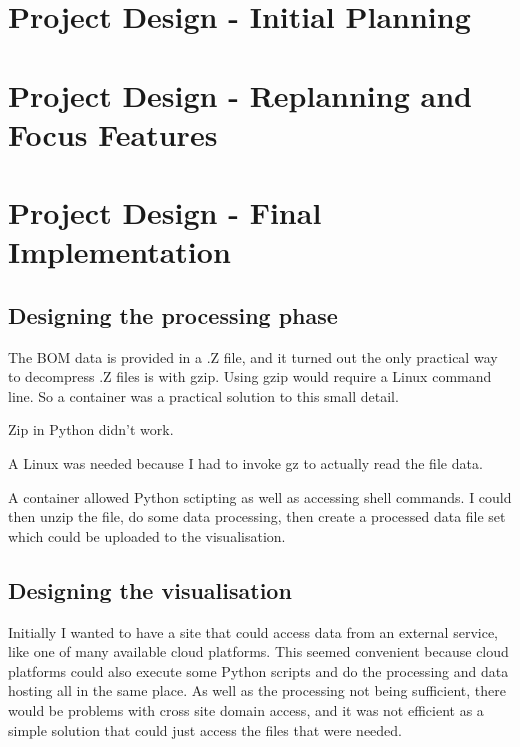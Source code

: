 \documentclass[12pt,a4paper]{report}
\begin{document}




\section{Project Design - Initial Planning}

\section{Project Design - Replanning and Focus Features}

\section{Project Design - Final Implementation}


\subsection{Designing the processing phase}
The BOM data is provided in a .Z file, and it turned out the only practical way to decompress .Z files is with gzip. Using gzip would require a Linux command line. So a container was a practical solution to this small detail.

Zip in Python didn't work. 

A Linux was needed because I had to invoke gz to actually read the file data. 

A container allowed Python sctipting as well as accessing shell commands. I could then unzip the file, do some data processing, then create a processed data file set which could be uploaded to the visualisation.


\subsection{Designing the visualisation}

Initially I wanted to have a site that could access data from an external service, like one of many available cloud platforms. This seemed convenient because cloud platforms could also execute some Python scripts and do the processing and data hosting all in the same place. As well as the processing not being sufficient, there would be problems with cross site domain access, and it was not efficient as a simple solution that could just access the files that were needed.
\end{document}
